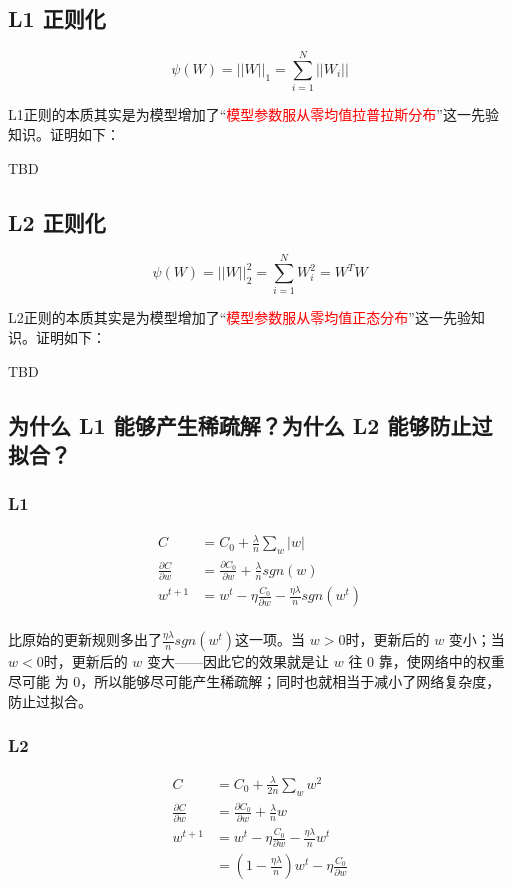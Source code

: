 \documentclass[12pt]{article}
\begin{document}
\subsection{L1 正则化}
$$
\psi(W) = ||W||_1 = \sum_{i=1}^N||W_i||
$$

L1正则的本质其实是为模型增加了“\textcolor{red}{模型参数服从零均值拉普拉斯分布}”这一先验知识。证明如下：

TBD

\subsection{L2 正则化}
$$
\psi(W) = ||W||_2^2 = \sum_{i=1}^NW_i^2 = W^TW
$$

L2正则的本质其实是为模型增加了“\textcolor{red}{模型参数服从零均值正态分布}”这一先验知识。证明如下：

TBD

\subsection{为什么 L1 能够产生稀疏解？为什么 L2 能够防止过拟合？\cite{Normalization_Method_L1_L2}\cite{Normalization_In_Machine_Learning}}

\subsubsection{L1}
\begin{align}
     C &= C_0 + \frac{\lambda}{n}\sum_{w}|w| \\
     \frac{\partial C}{\partial w} &= \frac{\partial C_0}{\partial w} + \frac{\lambda}{n}sgn(w) \\
     w^{t+1} &= w^t - \eta\frac{C_0}{\partial w} - \frac{\eta\lambda}{n}sgn(w^t) \\
\end{align}

比原始的更新规则多出了$\frac{\eta\lambda}{n}sgn(w^t)$这一项。当 $w > 0$时，更新后的 $w$ 变小；当 $w < 0$时，更新后的 $w$ 变大——因此它的效果就是让 $w$ 往 0 靠，使网络中的权重尽可能 为 0，所以能够尽可能产生稀疏解；同时也就相当于减小了网络复杂度，防止过拟合。

\subsubsection{L2}
\begin{align}
     C &= C_0 + \frac{\lambda}{2n}\sum_{w}w^2 \\
     \frac{\partial C}{\partial w} &= \frac{\partial C_0}{\partial w} + \frac{\lambda}{n}w \\
     w^{t+1} &= w^t - \eta\frac{C_0}{\partial w} - \frac{\eta\lambda}{n}w^t \\
     &= (1-\frac{\eta\lambda}{n})w^t - \eta\frac{C_0}{\partial w}
\end{align}
\end{document}

